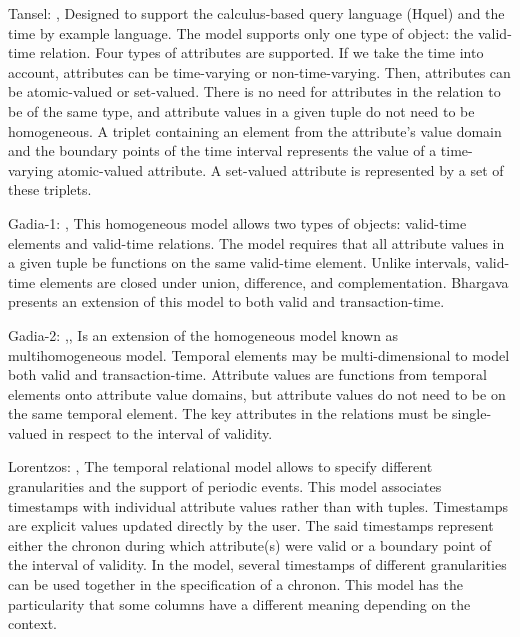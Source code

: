 Tansel: \cite{Tansel:1986:ATD:23125.23132},\cite{Clifford:1985:AHR:971699.318922} Designed to support the calculus-based query language (Hquel) and the time by example language. The model supports only one type of object: the valid-time relation. Four types of attributes are supported. If we take the time into account, attributes can be time-varying or non-time-varying. Then, attributes can be atomic-valued or set-valued. There is no need for attributes in the relation to be of the same type, and attribute values in a given tuple do not need to be homogeneous. A triplet containing an element from the attribute's value domain and the boundary points of the time interval represents the value of a time-varying atomic-valued attribute. A set-valued attribute is represented by a set of these triplets.

Gadia-1:  \cite{Gadia:1988:HRM:49346.50065},\cite{Gadia:1985:QLH:325405.325412} This homogeneous model allows two types of objects: valid-time elements and valid-time relations. The model requires that all attribute values in a given tuple be functions on the same valid-time element. Unlike intervals, valid-time elements are closed under union, difference, and complementation.
Bhargava presents an extension of this model to both valid and transaction-time. 

Gadia-2: \cite{Gadia:1986:TMM:645471.655410},\cite{Chuen},\cite{Gadia:1988:GMR:971701.50233} Is an extension of the homogeneous model known as multihomogeneous model. Temporal elements may be multi-dimensional to model both valid and transaction-time. Attribute values are functions from temporal elements onto attribute value domains, but attribute values do not need to be on the same temporal element. The key attributes in the relations must be single-valued in respect to the interval of validity. 

Lorentzos: \cite{springerlink:10.1007/3-540-19074-0_71},\cite{Lorentzos:1989:HDT:70777.70787} The temporal relational model allows to specify different granularities and the support of periodic events. This model associates timestamps with individual attribute values rather than with tuples. Timestamps are explicit values updated directly by the user. The said timestamps represent either the chronon during which attribute(s) were valid or a boundary point of the interval of validity. In the model, several timestamps of different granularities can be used together in the specification of a chronon.
This model has the particularity that some columns have a different meaning depending on the context.

